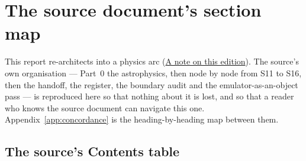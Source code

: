 
\section{The source document's section map}
\label{app:sectionmap}

This report re-architects  into a physics arc
(\hyperref[sec:edition]{A note on this edition}). The source's own organisation
--- Part~0 the astrophysics, then node by node from S11 to S16, then the
handoff, the register, the boundary audit and the emulator-as-an-object pass ---
is reproduced here so that nothing about it is lost, and so that a reader who
knows the source document can navigate this one.
Appendix~\ref{app:concordance} is the heading-by-heading map between them.

\subsection{The source's Contents table}
\label{app:sourcecontents}


